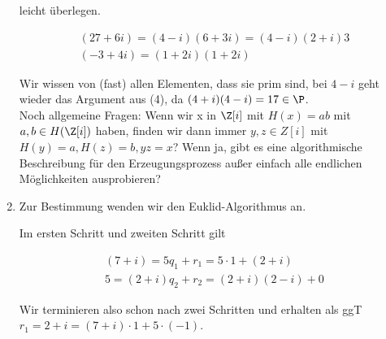 \begin{solution}
\begin{enumerate}
  leicht überlegen.

  \begin{align*}
    (27+6i) = (4-i)(6+3i) = (4-i)(2+i)3 \\
    (-3+4i) = (1+2i)(1+2i)
  \end{align*}

  Wir wissen von (fast) allen Elementen, dass sie prim sind, bei $4-i$ geht wieder das Argument aus (4),
  da $(4+i)(4-i) = 17 \in \P$. \\
  Noch allgemeine Fragen: Wenn wir x in $\Z[i]$ mit $H(x) = ab$ mit $a,b \in H(\Z[i])$ haben,
  finden wir dann immer $y,z \in Z[i]$ mit $H(y) = a, H(z) = b, yz = x$? Wenn ja,
  gibt es eine algorithmische Beschreibung für den Erzeugungsprozess außer einfach alle endlichen
  Möglichkeiten ausprobieren?

  \item Zur Bestimmung wenden wir den Euklid-Algorithmus an.

  Im ersten Schritt und zweiten Schritt gilt

  \begin{align*}
    (7+i) = 5 q_1 + r_1 = 5 \cdot 1 + (2+i) \\
    5 = (2+i)q_2 + r_2 = (2+i)(2-i) + 0
  \end{align*}

  Wir terminieren also schon nach zwei Schritten und erhalten als ggT $r_1 = 2+i = (7+i) \cdot 1 + 5 \cdot (-1)$.


\end{enumerate}

\end{solution}
